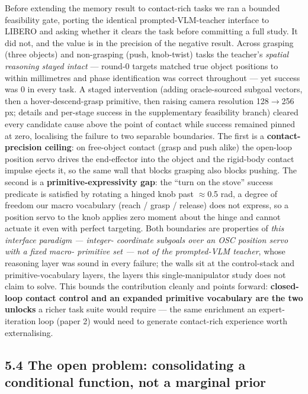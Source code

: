Before extending the memory result to contact-rich tasks we ran a
bounded feasibility gate, porting the identical prompted-VLM-teacher
interface to LIBERO and asking whether it clears the task before
committing a full study. It did not, and the value is in the precision
of the negative result. Across grasping (three objects) and non-grasping
(push, knob-twist) tasks the teacher's \emph{spatial reasoning stayed intact}
--- round-0 targets matched true object positions to within millimetres
and phase identification was correct throughout --- yet success was 0 in
every task. A staged intervention (adding oracle-sourced subgoal
vectors, then a hover-descend-grasp primitive, then raising camera
resolution 128$\rightarrow$256 px; details and per-stage success in the
supplementary feasibility branch) cleared every candidate cause above
the point of contact while success remained pinned at zero, localising
the failure to two separable boundaries. The first is a
\textbf{contact-precision ceiling}: on free-object contact (grasp and push
alike) the open-loop position servo drives the end-effector into the
object and the rigid-body contact impulse ejects it, so the same wall
that blocks grasping also blocks pushing. The second is a
\textbf{primitive-expressivity gap}: the ``turn on the stove'' success
predicate is satisfied by rotating a hinged knob past $\approx$0.5 rad, a
degree of freedom our macro vocabulary (reach / grasp / release) does
not express, so a position servo to the knob applies zero moment about
the hinge and cannot actuate it even with perfect targeting. Both
boundaries are properties of \emph{this interface paradigm --- integer-
coordinate subgoals over an OSC position servo with a fixed macro-
primitive set --- not of the prompted-VLM teacher}, whose reasoning layer
was sound in every failure; the walls sit at the control-stack and
primitive-vocabulary layers, the layers this single-manipulator study
does not claim to solve. This bounds the contribution cleanly and points
forward: \textbf{closed-loop contact control and an expanded primitive
vocabulary are the two unlocks} a richer task suite would require --- the
same enrichment an expert-iteration loop (paper 2) would need to
generate contact-rich experience worth externalising.

\subsection*{5.4 The open problem: consolidating a conditional function, not a marginal prior}

